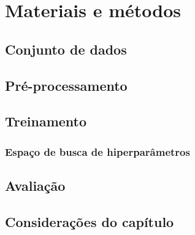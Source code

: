 \chapter{Materiais e métodos}


\section{Conjunto de dados}






\section{Pré-processamento}

\section{Treinamento}



\subsection{Espaço de busca de hiperparâmetros}

\section{Avaliação}

\section{Considerações do capítulo}

